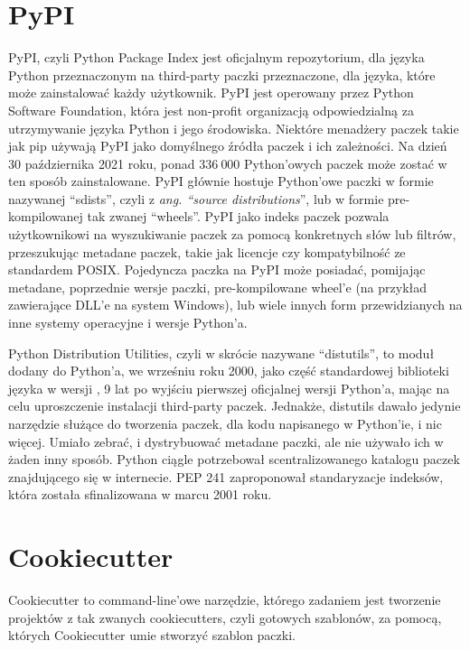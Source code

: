\section{PyPI}

PyPI, \cite{PyPI} \cite{AdvancedPythonDevelopment} czyli Python Package Index jest oficjalnym repozytorium, dla języka Python przeznaczonym na third-party paczki przeznaczone, dla języka, które może zainstalować każdy użytkownik. PyPI jest operowany przez Python Software Foundation, która jest non-profit organizacją odpowiedzialną za utrzymywanie języka Python i jego  środowiska. Niektóre menadżery paczek takie jak pip \cite{Pip} używają PyPI jako domyślnego źródła paczek i ich zależności. Na dzień 30 października 2021 roku, ponad $336 \ 000$ Python'owych paczek może zostać w ten sposób zainstalowane. PyPI głównie hostuje Python'owe paczki w formie nazywanej ``sdists'', czyli z \textit{ang. ``source distributions}'', lub w formie pre-kompilowanej tak zwanej ``wheels''. PyPI jako indeks paczek pozwala użytkownikowi na wyszukiwanie paczek za pomocą konkretnych słów lub filtrów, przeszukując metadane paczek, takie jak licencje czy kompatybilność ze standardem POSIX. Pojedyncza paczka na PyPI może posiadać, pomijając metadane, poprzednie wersje paczki, pre-kompilowane wheel'e (na przykład zawierające DLL'e na system Windows), lub wiele innych form przewidzianych na inne systemy operacyjne i wersje Python'a.

Python Distribution Utilities, czyli w skrócie nazywane ``distutils'', to moduł dodany do Python'a, we wrześniu roku 2000, jako część standardowej biblioteki języka w wersji , 9 lat po wyjściu pierwszej oficjalnej wersji Python'a, mając na celu uproszczenie instalacji third-party paczek.
Jednakże, distutils dawało jedynie narzędzie służące do tworzenia paczek, dla kodu napisanego w Python'ie, i nic więcej. Umiało zebrać, i dystrybuować metadane paczki, ale nie używało ich w żaden inny sposób. Python ciągle potrzebował scentralizowanego katalogu paczek znajdującego się w internecie. PEP 241 \cite{PEP241} zaproponował standaryzacje indeksów, która została sfinalizowana w marcu 2001 roku.


\clearpage

\section{Cookiecutter}
Cookiecutter \cite{CookieCutterDocumentation} \cite{CookiecutterGitHub} to command-line'owe narzędzie, którego zadaniem jest tworzenie projektów z tak zwanych cookiecutters, czyli gotowych szablonów, za pomocą, których Cookiecutter umie stworzyć szablon paczki.

